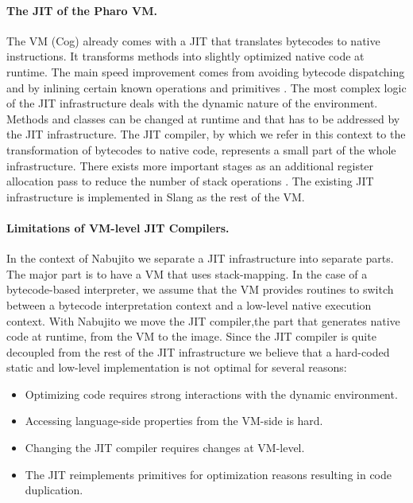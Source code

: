 \paragraph{The JIT of the Pharo VM.}
The \PH VM (Cog) already comes with a JIT that translates bytecodes to native instructions.
It transforms \ST methods into slightly optimized native code at runtime.
The main speed improvement comes from avoiding bytecode dispatching and by inlining certain known operations and primitives \cite{Ayco03a}.
The most complex logic of the JIT infrastructure deals with the dynamic nature of the \ST environment.
Methods and classes can be changed at runtime and that has to be addressed by the JIT infrastructure.
The JIT compiler, by which we refer in this context to the transformation of bytecodes to native code, represents a small part of the whole infrastructure.
There exists more important stages as an additional register allocation pass to reduce the number of stack operations \cite{Mira99a,Mira11a}.
The existing JIT infrastructure is implemented in Slang \cite[Ch.\ 5]{Blac09a} as the rest of the VM.

\paragraph{Limitations of VM-level JIT Compilers.}
In the context of Nabujito we separate a JIT infrastructure into separate parts.
The major part is to have a VM that uses stack-mapping.
In the case of a bytecode-based interpreter, we assume that the VM provides routines to switch between a bytecode interpretation context and a low-level native execution context.
With Nabujito we move the JIT compiler,the part that generates native code at runtime, from the VM to the image.%
 Since the JIT compiler is quite decoupled from the rest of the JIT infrastructure we believe that a hard-coded static and low-level implementation is not optimal for several reasons:

\begin{itemize}
	\item Optimizing \ST code requires strong interactions with the dynamic environment.
	\item Accessing language-side properties from the VM-side is hard.
	\item Changing the JIT compiler requires changes at VM-level.
	\item The JIT reimplements primitives for optimization reasons resulting in code duplication.
\end{itemize}

